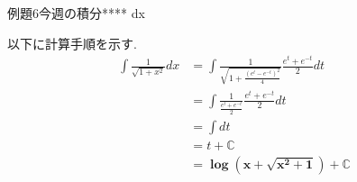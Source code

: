 \documentclass[main]{subfiles}
\begin{document}

\begin{newmondai}{例題}{6}{今週の積分}{****}
    \int {} dx
\end{newmondai}


\solutionhead
\hfill
以下に計算手順を示す.
\hfill\
\begin{align*}
    \int \frac{1}{\sqrt{1+x^2}} dx
        &= \int \frac{1}{\sqrt{1+\frac{\left(e^t-e^{-t}\right)^2}{4}}} \frac{e^t+e^{-t}}{2}dt \\
        &= \int \frac{1}{\frac{e^t+e^{-t}}{2}}\frac{e^t+e^{-t}}{2} dt \\
        &= \int dt \\
        &= t+\mathbb{C} \\
        &= \boldsymbol{\log \left(x+\sqrt{x^2+1}\right)+\mathbb{C}}
\end{align*}
\end{document}
